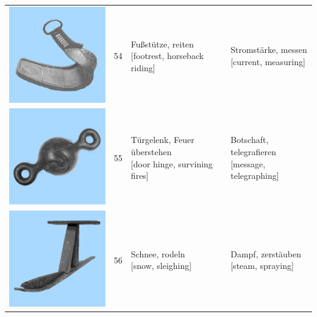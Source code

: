 \documentclass[
  english,
  doc,12pt,twoside,floatsintext]{apa7}
\begin{document}
\begin{center}
\begin{ThreePartTable}
{\begin{longtable}{llll}
\includegraphics[valign=c, scale=0.23]{../materials/unfamiliar/54.png} & 54 & \makecell[l]{Fußstütze, reiten\\{[footrest, horseback riding]}} & \makecell[l]{Stromstärke, messen\\{[current, measuring]}}\\
\includegraphics[valign=c, scale=0.23]{../materials/unfamiliar/55.png} & 55 & \makecell[l]{Türgelenk, Feuer überstehen\\{[door hinge, survining fires]}} & \makecell[l]{Botschaft, telegrafieren\\{[message, telegraphing]}}\\
\includegraphics[valign=c, scale=0.23]{../materials/unfamiliar/56.png} & 56 & \makecell[l]{Schnee, rodeln\\{[snow, sleighing]}} & \makecell[l]{Dampf, zerstäuben\\{[steam, spraying]}}\\

\end{longtable}}
\end{ThreePartTable}
\end{center}
\end{document}
